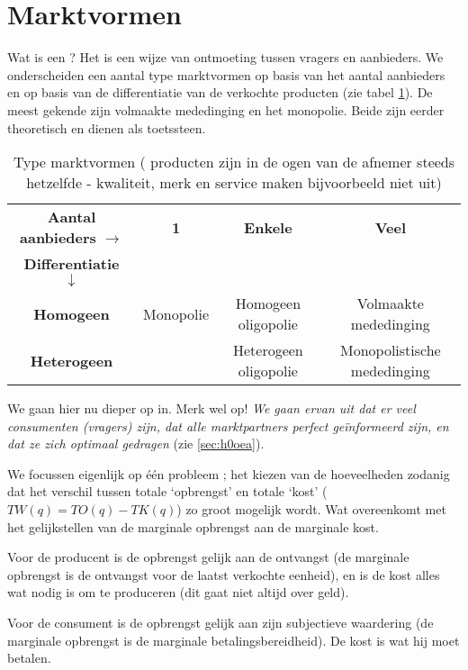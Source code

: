 \section{Marktvormen}

Wat is een ? Het is een wijze van ontmoeting tussen vragers en aanbieders. We onderscheiden een aantal type marktvormen op basis van het aantal aanbieders en op basis van de differentiatie van de verkochte producten (zie tabel \ref{tab:h3vormen}). De meest gekende zijn volmaakte mededinging en het monopolie. Beide zijn eerder theoretisch en dienen als toetssteen.

\begin{table}[H]
\small\centering\captionsetup{justification=centering,margin=2cm}
\begin{tabular}{c | c | c | c}
\textbf{Aantal aanbieders} $\rightarrow$ & \textbf{1} & \textbf{Enkele} & \textbf{Veel}\\
\textbf{Differentiatie} $\downarrow$ & & & \\
\hline
\textbf{Homogeen} & Monopolie & Homogeen oligopolie & Volmaakte mededinging \\
\textbf{Heterogeen} & & Heterogeen oligopolie & Monopolistische mededinging \\
\end{tabular}
\caption{Type marktvormen ( producten zijn in de ogen van de afnemer steeds hetzelfde - kwaliteit, merk en service maken bijvoorbeeld niet uit)}
\label{tab:h3vormen}
\end{table}

We gaan hier nu dieper op in. Merk wel op! \textit{We gaan ervan uit dat er veel consumenten (vragers) zijn, dat alle marktpartners perfect ge\"informeerd zijn, en dat ze zich optimaal gedragen} (zie \ref{sec:h0oea}). 
\par We focussen eigenlijk op \'e\'en probleem ; het kiezen van de hoeveelheden zodanig dat het verschil tussen totale `opbrengst' en totale `kost' ($TW(q)=TO(q)-TK(q)$) zo groot mogelijk wordt.  Wat overeenkomt met het gelijkstellen van de marginale opbrengst aan de marginale kost.
\par Voor de producent is de opbrengst gelijk aan de ontvangst (de marginale opbrengst is de ontvangst voor de laatst verkochte eenheid), en is de kost alles wat nodig is om te produceren (dit gaat niet altijd over geld).
\par Voor de consument is de opbrengst gelijk aan zijn subjectieve waardering (de marginale opbrengst is de marginale betalingsbereidheid). De kost is wat hij moet betalen.\\

